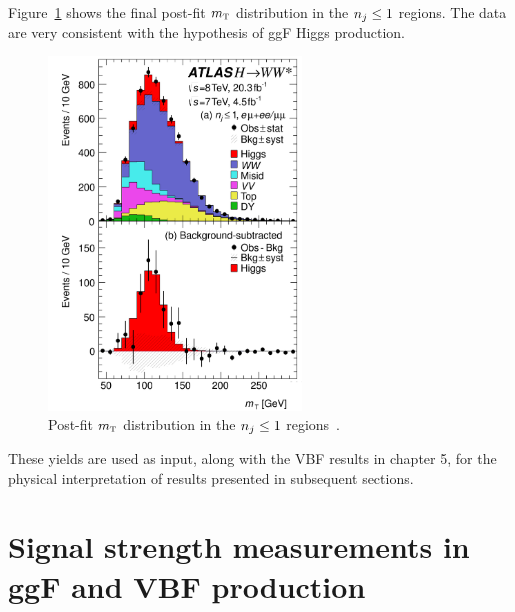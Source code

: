 Figure~\ref{fig:ggF-mT} shows the final post-fit $m_{\textrm{\footnotesize\sc t}}$ distribution in the $n_j \leq 1$ regions. The data are very consistent with the hypothesis of ggF Higgs production. 
%
\begin{figure}[h!]
  \centering
  \captionsetup{justification=centering}

  \includegraphics[width=0.6\textwidth]{figures/ggF_mT}
  \caption{Post-fit $m_{\textrm{\footnotesize\sc t}}$ distribution in the $n_j \leq 1$ regions~\cite{WW2015}.}
  \label{fig:ggF-mT}
\end{figure}
%
These yields are used as input, along with the VBF results in chapter 5, for the physical interpretation of results presented in subsequent sections. 

\section{Signal strength measurements in ggF and VBF production}

